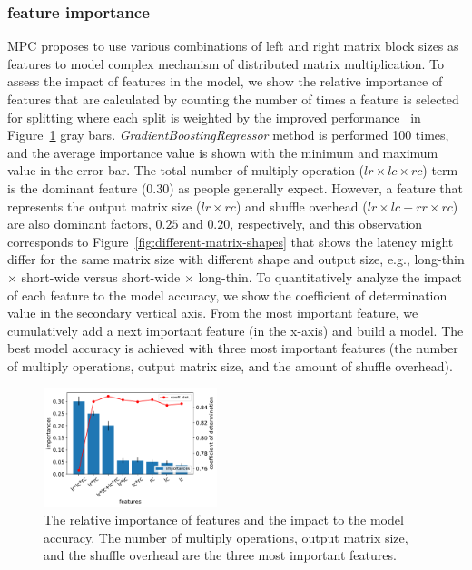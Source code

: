 \documentclass[10pt, conference, compsocconf]{IEEEtran}
\begin{document}
\subsubsection{feature importance} MPC proposes to use various combinations of left and right matrix block sizes as features to model complex mechanism of distributed matrix multiplication. To assess the impact of features in the model, we show the relative importance of features that are calculated by counting the number of times a feature is selected for splitting where each split is weighted by the improved performance~\cite{gb-feature-importance} in Figure~\ref{fig:feature-importance} gray bars. \emph{GradientBoostingRegressor} method is performed 100 times, and the average importance value is shown with the minimum and maximum value in the error bar. The total number of multiply operation ($lr \times lc \times rc$) term is the dominant feature (0.30) as people generally expect. However, a feature that represents the output matrix size ($lr \times rc$) and shuffle overhead ($lr \times lc + rr \times rc$) are also dominant factors, $0.25$ and $0.20$, respectively, and this observation corresponds to Figure~\ref{fig:different-matrix-shapes} that shows the latency might differ for the same matrix size with different shape and output size, e.g., long-thin $\times$ short-wide versus short-wide $\times$ long-thin. To quantitatively analyze the impact of each feature to the model accuracy, we show the coefficient of determination value in the secondary vertical axis. From the most important feature, we cumulatively add a next important feature (in the x-axis) and build a model. The best model accuracy is achieved with three most important features (the number of multiply operations, output matrix size, and the amount of shuffle overhead).

\begin{figure}
  \centering\includegraphics[width=0.45\textwidth]{figures/feature-importance.pdf}\caption{The relative importance of features and the impact to the model accuracy. The number of multiply operations, output matrix size, and  the shuffle overhead are the three most important features.}\label{fig:feature-importance}
\end{figure}
\end{document}
